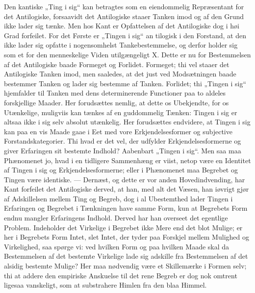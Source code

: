 \documentclass[12pt]{book}
\newcommand{\opage}[1]{\marginnote{\footnotesize\textit{[#1]}}}
\begin{document}
Den kantiske „Ting i sig“ kan betragtes som en eiendommelig
Repræsentant for det Antilogiske, forsaavidt det
Antilogiske staaer Tanken imod og af den Grund ikke lader sig
tænke. Men hos Kant er Opfattelsen af det Antilogiske dog
i høi Grad forfeilet. For det Første er „Tingen i sig“ an%
\opage{116}tilogisk i den Forstand, at den ikke lader sig opfatte i nogensomhelst
Tankebestemmelse, og derfor holder sig som et for
den menneskelige Viden utilgængeligt X. Dette er nu for
Bestemmelsen af det Antilogiske baade Formeget og Forlidet.
Formeget; thi vel staaer det Antilogiske Tanken imod, men
saaledes, at det just ved Modsætningen baade bestemmer Tanken
og lader sig bestemme af Tanken. Forlidet; thi „Tingen
i sig“ hjemfalder til Tanken med dens determinerende
Functioner paa to aldeles forskjellige Maader. Her forudsættes
nemlig, at dette os Ubekjendte, for os Utænkelige, muligviis
kan tænkes af en guddommelig Tænken: Tingen i sig
er altsaa ikke i sig selv absolut utænkelig. Her forudsættes
endvidere, at Tingen i sig kan paa en vis Maade gaae i
Eet med vore Erkjendelsesformer og subjective Forstandskategorier.
Thi hvad er det vel, der udfylder Erkjendelsesformerne
og giver Erfaringen sit bestemte Indhold? Aabenbart „Tingen
i sig“. Men saa maa Phænomenet jo, hvad i en tidligere
Sammenhæng er viist, netop være en Identitet af Tingen i
sig og Erkjendelsesformerne; eller i Phænomenet maa Begrebet
og Tingen være identiske. --- Dernæst, og dette er
vor anden Hovedindvending, har Kant forfeilet det Antilogiske
derved, at han, med alt det Væsen, han iøvrigt gjør af Adskillelsen
mellem Ting og Begreb, dog i al Ubestemthed
lader Tingen i Erfaringen og Begrebet i Tænkningen have
samme Form, kun at Begrebets Form endnu mangler Erfaringens
Indhold. Derved har han overseet det egentlige
Problem. Indeholder det Virkelige i Begrebet ikke Mere end
det blot Mulige; er her i Begrebets Form Intet, slet Intet,
der tyder paa Forskjel mellem Mulighed og Virkelighed, saa
spørge vi: ved hvilken Form og paa hvilken Maade skal da
Bestemmelsen af det bestemte Virkelige lade sig adskille fra
Bestemmelsen af det alsidig bestemte Mulige? Her maa nødvendig
være et Skillemærke i Formen selv; thi at addere den
empiriske Anskuelse til det rene Begreb er dog nok omtrent
\opage{117}ligesaa vanskeligt, som at substrahere Himlen fra den blaa
Himmel.
\end{document}

